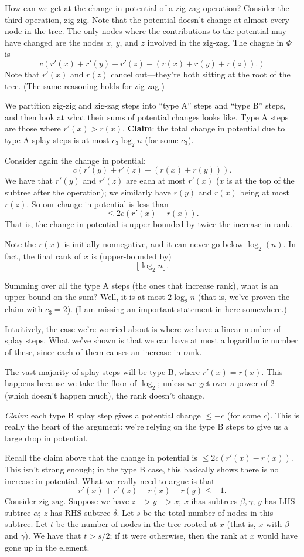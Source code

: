 \documentclass{article}
\begin{document}
How can we get at the change in potential of a zig-zag operation?
Consider the third operation, zig-zig.
Note that the potential doesn't change at almost every node in the tree.
The only nodes where the contributions to the potential may have changed
are the nodes $x$, $y$, and $z$ involved in the zig-zag.
The chagne in $\Phi$ is
$$
c (r'(x) + r'(y) + r'(z) - (r(x) + r(y) + r(z)).)
$$
Note that $r'(x)$ and $r(z)$ cancel out---they're both sitting at the
root of the tree.
(The same reasoning holds for zig-zag.)

We partition zig-zig and zig-zag steps into ``type A'' steps and ``type B''
steps, and then look at what their sums of potential changes looks like.
Type A steps are those where $r'(x) > r(x)$.
\textbf{Claim}: the total change in potential due to type A splay steps is
at most $c_3 \log_2 n$ (for some $c_3$).

Consider again the change in potential:
$$
c (r'(y) + r'(z) - (r(x) + r(y))).
$$
We have that $r'(y)$ and $r'(z)$ are each at most $r'(x)$ ($x$ is at the
top of the subtree after the operation); 
we similarly have $r(y)$ and $r(x)$ being at most $r(z)$.
So our change in potential is less than
$$
\leq 2c (r'(x) - r(x)).
$$
That is, the change in potential is upper-bounded by twice the increase
in rank.

Note the $r(x)$ is initially nonnegative, and it can never go below
$\log_2(n)$.
In fact, the final rank of $x$ is (upper-bounded by)
$$
\lfloor \log_2 n\rfloor.
$$

Summing over all the type A steps (the ones that increase rank), what is an
upper bound on the sum? 
Well, it is at most $2\log_2 n$ (that is, we've proven the claim with $c_3 = 2$).
(I am missing an important statement in here somewhere.)

Intuitively, the case we're worried about is where we have a linear number
of splay steps.
What we've shown is that we can have at most a logarithmic number of these,
since each of them causes an increase in rank.

The vast majority of splay steps will be type B, where $r'(x) = r(x)$.
This happens because we take the floor of $\log_2$; unless we get over
a power of 2 (which doesn't happen much), the rank doesn't change.

\textit{Claim}:
each type B splay step gives a potential change $\leq -c$ (for some $c$).
This is really the heart of the argument: we're relying on the type B
steps to give us a large drop in potential.

Recall the claim above that the change in potential is $\leq 2c(r'(x) - r(x))$.
This isn't strong enough; in the type B case, this basically shows there is
no increase in potential.
What we really need to argue is that
$$
r'(x) + r'(z) - r(x) - r(y) \leq -1.
$$
Consider zig-zag.
Suppose we have $z -> y -> x$; $x$ ihas subtrees $\beta,\gamma$; $y$ has LHS
subtree $\alpha$; $z$ has RHS subtree $\delta$.
Let $s$ be the total number of nodes in this subtree.
Let $t$ be the number of nodes in the tree rooted at $x$ (that is, $x$ with
$\beta$ and $\gamma$).
We have that $t > s / 2$; if it were otherwise, then the rank
at $x$ would have gone up in the element.
\end{document}
